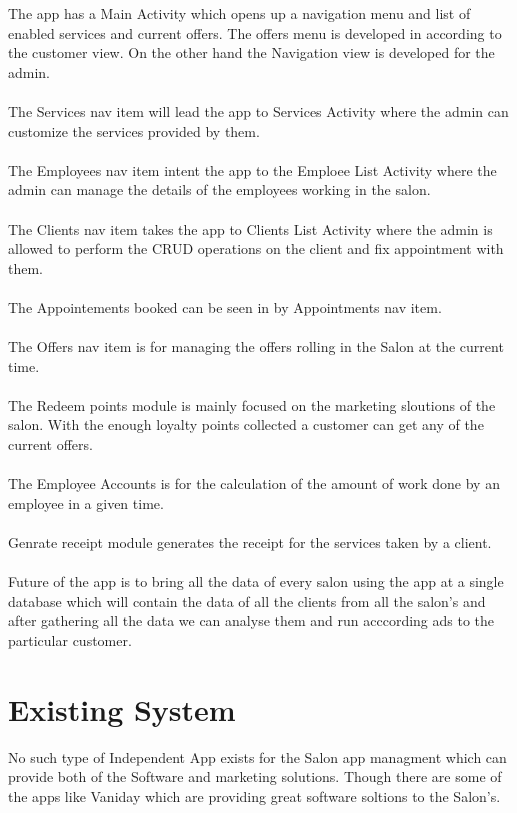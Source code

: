 The app has a Main Activity which opens up a navigation menu and list of enabled services and current offers. The offers menu is developed in according to the customer view.
On the other hand the Navigation view is developed for the admin.
\\
\\
The Services nav item will lead the app to Services Activity where the admin can customize the services provided by them.
\\
\\
The Employees nav item intent the app to the Emploee List Activity where the admin can manage the details of the employees working in the salon.
\\
\\
The Clients nav item takes the app to Clients List Activity where the admin is allowed to perform the CRUD operations on the client and fix appointment with them.
\\
\\
The Appointements booked can be seen in by Appointments nav item.
\\
\\
The Offers nav item is for managing the offers rolling in the Salon at the current time.
\\
\\
The Redeem points module is mainly focused on the marketing sloutions of the salon. With the enough loyalty points collected a customer can get any of the current offers.
\\
\\
The Employee Accounts is for the calculation of the amount of work done by an employee in a given time.
\\
\\
Genrate receipt module generates the receipt for the services taken by a client.
\\
\\

Future of the app is to bring all the data of every salon using the app at a single database which will contain the data of all the clients from all the salon's and after gathering all the data we can analyse them and run acccording ads to the particular customer.

\section{Existing System}
No such type of Independent App exists for the Salon app managment which can provide both of the Software and marketing solutions. Though there are some of the apps like Vaniday which are providing great software soltions to the Salon's.


